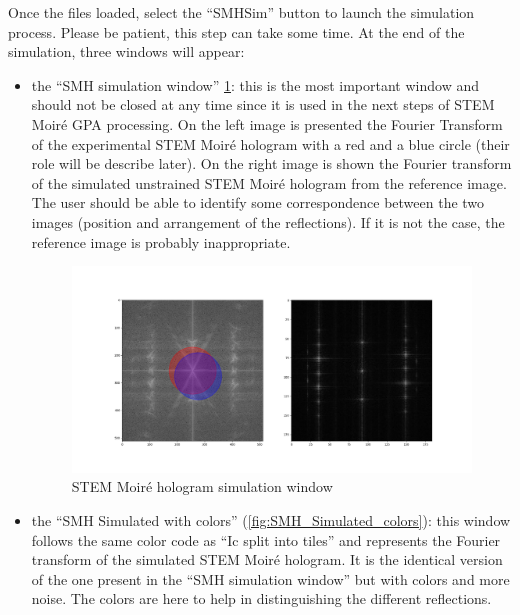\documentclass[12pt, titlepage]{article}
\newcommand{\progname}{STEM Moir{\'e} GPA}
\begin{document}
Once the files loaded, select the \enquote{SMHSim} button to launch the simulation process. Please be patient, this step can take some time. At the end of the simulation, three windows will appear:
\begin{itemize}
\item the \enquote{SMH simulation window} \cref{fig:SMH_Simulation}: this is the most important window and should not be closed at any time since it is used in the next steps of \progname{} processing. On the left image is presented the Fourier Transform of the experimental STEM Moir{\'e} hologram with a red and a blue circle (their role will be describe later). On the right image is shown the Fourier transform of the simulated unstrained STEM Moir{\'e} hologram from the reference image. The user should be able to identify some correspondence between the two images (position and arrangement of the reflections). If it is not the case, the reference image is probably inappropriate. 

\begin{figure}[H]
\centering
\includegraphics[scale=0.35]{Figures/SMH_Simulation.png}
\caption{STEM Moir{\'e} hologram simulation window}
\label{fig:SMH_Simulation}
\end{figure}

\item the \enquote{SMH Simulated with colors} (\cref{fig:SMH_Simulated_colors}): this window follows the same color code as  \enquote{Ic split into tiles} and represents the Fourier transform of the simulated STEM Moir{\'e} hologram. It is the identical version of the one present in the \enquote{SMH simulation window} but with colors and more noise. The colors are here to help in distinguishing the different reflections.


\end{itemize}
\end{document}
